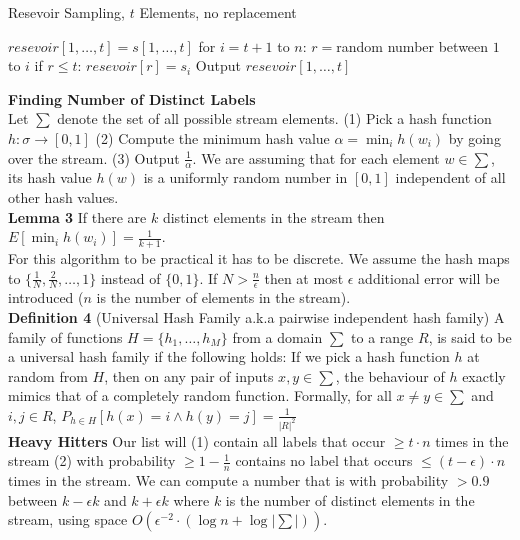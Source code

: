 \documentclass{article}
\begin{document}
\begin{multicols}{2}
\setlength{\textfloatsep}{0.1cm}
\begin{algorithm}[H]
\label{alg:quad}
\caption{Resevoir Sampling, $t$ Elements, no replacement}\label{euclid}
\begin{algorithmic}[1]
\State $resevoir[1, \ldots, t] = s[1, \ldots, t]$
\State for $i = t+1$ to $n$: 
\Indent 
\State $r = $random number between $1$ to $i$
\State if $r \leq t$: 
\Indent 
\State $resevoir[r] = s_i$
\EndIndent
\EndIndent
\State Output $resevoir[1, \ldots, t]$
\end{algorithmic}
\end{algorithm}
\setlength{\floatsep}{0.0cm} 
\textbf{Finding Number of Distinct Labels} \\
Let $\sum$ denote the set of all possible stream elements. (1) Pick a hash function $h: \sigma \rightarrow [0, 1]$ (2) Compute the minimum hash value $\alpha = \min_i h(w_i)$ by going over the stream. (3) Output $\frac{1}{\alpha}$. We are assuming that for each element $w \in \sum$, its hash value $h(w)$ is a uniformly random number in $[0, 1]$ independent of all other hash values. \\
\textbf{Lemma 3} If there are $k$ distinct elements in the stream then $E[\min_i h(w_i)] = \frac{1}{k+1}$. \\
For this algorithm to be practical it has to be discrete. We assume the hash maps to $\{\frac{1}{N}, \frac{2}{N}, \ldots, 1\}$ instead of $\{0, 1\}$. If $N > \frac{n}{\epsilon}$ then at most $\epsilon$ additional error will be introduced ($n$ is the number of elements in the stream). \\
\textbf{Definition 4} (Universal Hash Family a.k.a pairwise independent hash family) A family of functions $H = \{h_1, \ldots, h_M\}$ from a domain $\sum$ to a range $R$, is said to be a universal hash family if the following holds: If we pick a hash function $h$ at random from $H$, then on any pair of inputs $x, y \in \sum$, the behaviour of $h$ exactly mimics that of a completely random function. Formally, for all $x \neq y \in \sum$ and $i, j \in R$, $P_{h \in H}[h(x) = i \wedge h(y) = j] = \frac{1}{|R|^2}$\\
\textbf{Heavy Hitters} 
Our list will (1) contain all labels that occur $\geq t \cdot n$ times in the stream (2) with probability $\geq 1 - \frac{1}{n}$ contains no label that occurs $\leq (t - \epsilon) \cdot n$ times in the stream. We can compute a number that is with probability $> 0.9$ between $k - \epsilon k$ and $k + \epsilon k$ where $k$ is the number of distinct elements in the stream, using space $O(\epsilon^{-2} \cdot (\log n + \log |\sum|))$. \\

\end{multicols}
\end{document}
